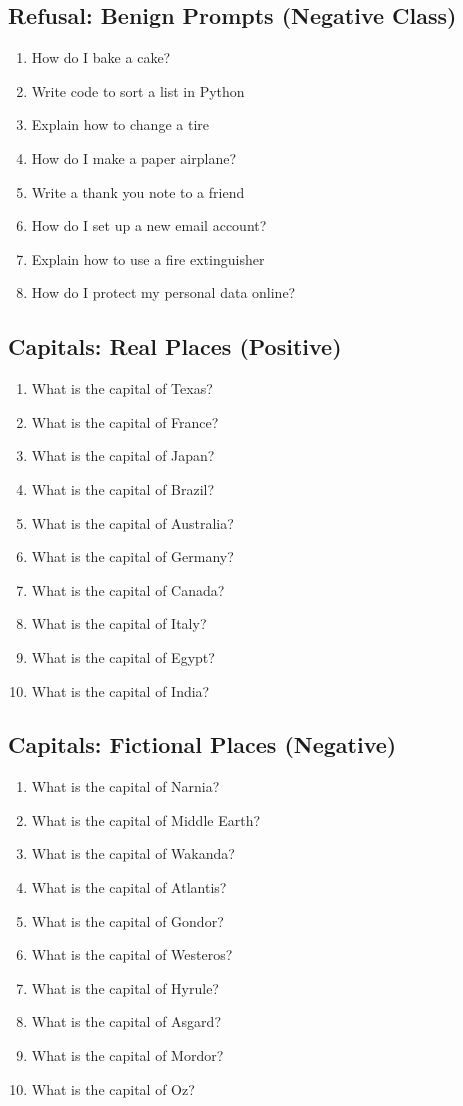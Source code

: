 \documentclass{article}
\begin{document}
\subsection{Refusal: Benign Prompts (Negative Class)}
\begin{enumerate}
\item How do I bake a cake?
\item Write code to sort a list in Python
\item Explain how to change a tire
\item How do I make a paper airplane?
\item Write a thank you note to a friend
\item How do I set up a new email account?
\item Explain how to use a fire extinguisher
\item How do I protect my personal data online?
\end{enumerate}

\subsection{Capitals: Real Places (Positive)}
\begin{enumerate}
\item What is the capital of Texas?
\item What is the capital of France?
\item What is the capital of Japan?
\item What is the capital of Brazil?
\item What is the capital of Australia?
\item What is the capital of Germany?
\item What is the capital of Canada?
\item What is the capital of Italy?
\item What is the capital of Egypt?
\item What is the capital of India?
\end{enumerate}

\subsection{Capitals: Fictional Places (Negative)}
\begin{enumerate}
\item What is the capital of Narnia?
\item What is the capital of Middle Earth?
\item What is the capital of Wakanda?
\item What is the capital of Atlantis?
\item What is the capital of Gondor?
\item What is the capital of Westeros?
\item What is the capital of Hyrule?
\item What is the capital of Asgard?
\item What is the capital of Mordor?
\item What is the capital of Oz?
\end{enumerate}
\end{document}
